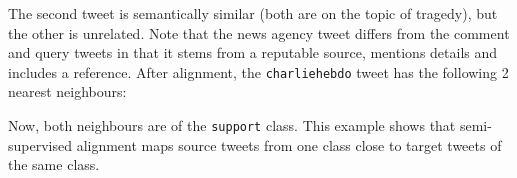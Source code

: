 \documentclass[letterpaper]{article} %
\begin{document}
\noindent {}
\noindent {}

%

\noindent The second tweet is semantically similar (both are on the topic of tragedy), but the other is unrelated. Note that the news agency tweet differs from the comment and query tweets in that it stems from a reputable source, mentions details and includes a reference. After alignment, the \texttt{charliehebdo} tweet has the following 2 nearest neighbours:

\noindent {}
\noindent {}
Now, both neighbours are of the \texttt{support} class. This example shows that semi-supervised alignment maps source tweets from one class close to target tweets of the same class.
\end{document}
